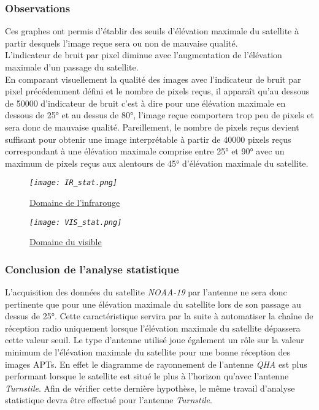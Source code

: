 \documentclass[12pt,fleqn]{book} %
\begin{document}
\subsubsection{Observations}
\noindent Ces graphes ont permis d'établir des seuils d'élévation maximale du satellite à partir desquels l'image reçue sera ou non de mauvaise qualité. 
~\\L'indicateur de bruit par pixel diminue avec l'augmentation de l'élévation maximale d'un passage du satellite.
~\\En comparant visuellement la qualité des images avec l'indicateur de bruit par pixel précédemment défini et le nombre de pixels reçus, il apparaît qu'au dessous de 50000 d'indicateur de bruit c'est à dire pour une élévation maximale en dessous de 25° et au dessus de 80°, l'image reçue comportera trop peu de pixels et sera donc de mauvaise qualité. Pareillement, le nombre de pixels reçus devient suffisant pour obtenir une image interprétable à partir de 40000 pixels reçus correspondant à une élévation maximale comprise entre 25° et 90° avec un maximum de pixels reçus aux alentours de 45° d'élévation maximale du satellite.  
\begin{figure}[H]
	\centering
	\itshape
	\texttt{[image: IR\_stat.png]}
	\caption{\label{IR_stat} \underline{Domaine de l'infrarouge}}
\end{figure}
\begin{figure}[H]
	\centering
	\itshape
	\texttt{[image: VIS\_stat.png]}
	\caption{\label{VIS_stat} \underline{Domaine du visible}}
\end{figure}
\subsubsection{Conclusion de l'analyse statistique}
\noindent L'acquisition des données du satellite \emph{NOAA-19} par l'antenne ne sera donc pertinente que pour une élévation maximale du satellite lors de son passage au dessus de 25°. Cette caractéristique servira par la suite à automatiser la chaîne de réception radio uniquement lorsque l'élévation maximale du satellite dépassera cette valeur seuil.
Le type d'antenne utilisé joue également un rôle sur la valeur minimum de l'élévation maximale du satellite pour une bonne réception des images APTs. En effet le diagramme de rayonnement de l'antenne \emph{QHA} est plus performant lorsque le satellite est situé le plus à l'horizon qu'avec l'antenne \emph{Turnstile}. Afin de vérifier cette dernière hypothèse, le même travail d'analyse statistique devra être effectué pour l'antenne \emph{Turnstile}.
\end{document}

